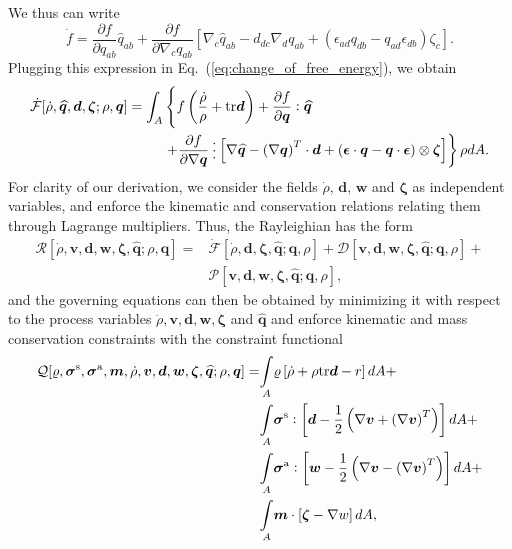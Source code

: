 We thus can write
\begin{equation}
	\dot{f} = \frac{\partial f}{\partial q_{ab}}\widehat{q}_{ab} + \frac{\partial f}{\partial \nabla_c q_{ab}}\left[ \nabla_c \widehat{q}_{ab} - d_{dc} \nabla_d q_{ab} + \left(\epsilon_{ad} q_{db} - q_{ad}  \epsilon_{db} \right) \zeta_c\right].
\end{equation}
Plugging this expression in Eq.~(\ref{eq:change_of_free_energy}), we obtain
\begin{equation}
	\begin{aligned}
		\label{eq:dotF}
		\dot{\mathcal{F}}[\dot{\rho},\widehat{\bm{q}},\bm{d},\bm{\zeta};\rho,\bm{q}] = \int_{A} &\left\{ f \left(\frac{\dot{\rho}}{\rho}+{\rm tr} \bm{d}\right)  +\frac{\partial  f}{\partial \bm{q}} : \widehat{\bm{q}}\right.\\ 
		&\left.+ \frac{\partial  f}{\partial \nabla \bm{q}} \cdddot \, \left[\nabla \widehat{\bm{q}} - \left(\nabla \bm{q}\right)^T \cdot\bm{d} +\left(\bm{\epsilon} \cdot \bm{q} - \bm{q} \cdot \bm{\epsilon}\right)\otimes \bm{\zeta} \right]\right\} \rho dA.
	\end{aligned}
\end{equation}
For clarity of our derivation, we consider the fields $\dot{\rho}$, $\bm{d}$, $\bm{w}$ and $\bm{\zeta}$ as independent variables, and enforce the kinematic and conservation relations relating them through Lagrange multipliers. Thus, the Rayleighian has the form
\begin{align}
	\label{eq:Rayleighian}
	\mathcal{R}\left[\dot{\rho},\bm{v},\bm{d},\bm{w},\bm{\zeta},\widehat{\bm{q}};\rho,\bm{q}\right] = & \dot{\mathcal{F}}[\dot{\rho},\bm{d},\bm{\zeta},\widehat{\bm{q}};\bm{q},\rho] + 
	\mathcal{D}\left[\bm{v},\bm{d},\bm{w},\bm{\zeta},\widehat{\bm{q}}; \bm{q},\rho\right] +  \\ & \mathcal{P}\left[\bm{v},\bm{d},\bm{w},\bm{\zeta},\widehat{\bm{q}}; \bm{q},\rho\right], \nonumber
\end{align}
and the governing equations can then be obtained by minimizing it with respect to the process variables $\dot{\rho}, \bm{v},\bm{d},\bm{w},\bm{\zeta}$ and $\widehat{\bm{q}}$ and enforce kinematic and mass conservation constraints with the constraint functional
\begin{equation}
	\label{eq:constraints}
	\begin{aligned}
		\mathcal{Q}[\varrho, \bm{\sigma}^{\rm s}, \bm{\sigma}^{\rm a},\bm{m}, \dot{\rho},\bm{v},\bm{d},\bm{w},\bm{\zeta},\widehat{\bm{q}};\rho,\bm{q}] =
		& \underset{A}{\int} \varrho  \left[\dot{\rho} + \rho{\rm tr}\bm{d}- r\right] dA  + \\
		& \underset{A}{\int} \bm{\sigma}^{\rm s} :\left[\bm{d} - \frac{1}{2}\left(\nabla \bm{v} + \left(\nabla\bm{v}\right)^T\right)\right] dA + \\
		& \underset{A}{\int} \bm{\sigma}^{\rm a} :\left[\bm{w} - \frac{1}{2}\left(\nabla \bm{v} - \left(\nabla\bm{v}\right)^T\right)\right] dA + \\
		& \underset{A}{\int} \bm{m} \cdot \left[\bm{\zeta} - \nabla w\right] dA,
	\end{aligned}
\end{equation}
